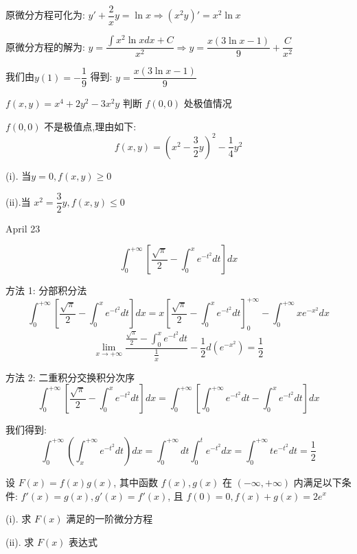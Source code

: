 \begin{solution}
	
	原微分方程可化为: $y'+\dfrac{2}{x}y=\ln x\Rightarrow (x^2y)'=x^2\ln x$
	
	原微分方程的解为: $y=\dfrac{\int x^2\ln xdx+C}{x^2}\Rightarrow y=\dfrac{x(3\ln x-1)}{9}+\dfrac{C}{x^2}$
	
	我们由$y(1)=-\dfrac{1}{9}$ 得到: $y=\dfrac{x(3\ln x-1)}{9}$
\end{solution}

\begin{example}[][Exam: 30.4.2]
	$f(x,y)=x^4+2y^2-3x^2y$ 判断 $f(0,0)$ 处极值情况
\end{example}

\begin{solution}
	
	$f(0,0)$ 不是极值点,理由如下: 
	$$f(x,y)=(x^2-\frac{3}{2}y)^2-\frac{1}{4}y^2$$
	
	(i). 当$y=0,f(x,y)\geq 0$
	
	(ii).当 $x^2=\dfrac{3}{2}y,f(x,y)\leq 0$
\end{solution}


\textcolor{purplea}{April 23}

\begin{example}[][Exam: 30.4.3]
	$$\int_{0}^{+\infty}\left[ \dfrac{\sqrt{\pi}}{2}-\int_{0}^{x}e^{-t^2}dt\right]dx$$
\end{example}

\begin{solution}
	
	方法 1:  分部积分法
	$$\int_{0}^{+\infty}\left[ \frac{\sqrt{\pi}}{2}-\int_{0}^{x}e^{-t^2}dt\right]dx=x\left[ \frac{\sqrt{\pi}}{2}-\int_{0}^{x}e^{-t^2}dt\right]_{0}^{+\infty}-\int_{0}^{+\infty}xe^{-x^2}dx$$
	$$\lim\limits_{x\to +\infty}\frac{\frac{\sqrt{\pi}}{2}-\int_{0}^{x}e^{-t^2}dt}{\frac{1}{x}}-\frac{1}{2}d(e^{-x^2})=\frac{1}{2}$$
	
	
	方法 2:  二重积分交换积分次序
	$$\int_{0}^{+\infty}\left[ \frac{\sqrt{\pi}}{2}-\int_{0}^{x}e^{-t^2}dt\right]dx=\int_{0}^{+\infty}\left[\int_{0}^{+\infty}e^{-t^2}dt-\int_{0}^{x}e^{-t^2}dt\right]dx$$
	
	我们得到: 
	$$\int_{0}^{+\infty}(\int_{x}^{+\infty}e^{-t^2}dt)dx=\int_{0}^{+\infty}dt\int_{0}^{t}e^{-t^2}dx=\int_{0}^{+\infty}te^{-t^2}dt=\frac{1}{2}$$
\end{solution}

\begin{example}[][Exam: 30.4.4]
	设 $F(x)=f(x)g(x)$, 其中函数 $f(x),g(x)$ 在 $(-\infty,+\infty)$ 内满足以下条件: $f'(x)=g(x), g'(x)=f'(x)$, 且 $f(0)=0, f(x)+g(x)=2e^x$

(i). 求 $F(x)$ 满足的一阶微分方程

(ii). 求 $F(x)$ 表达式
\end{example}


